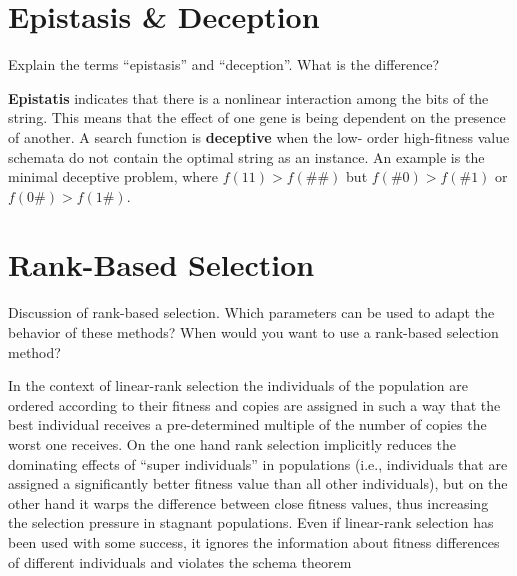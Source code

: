 \documentclass[../main.tex]{subfiles}
\begin{document}
\section{Epistasis & Deception}
\begin{question}
Explain the terms ``epistasis'' and ``deception''. What is the difference?
\end{question}
\begin{solution}
\textbf{Epistatis} indicates that there is a nonlinear interaction among the bits of the string. This means that the
effect of one gene is being dependent on the presence of another. A search function is \textbf{deceptive} when the low-
order high-fitness value schemata do not contain the optimal string as an instance. An example is the minimal deceptive
problem, where $f(11) > f(\#\#)$ but $f(\#0) > f(\#1)$ or $f(0\#) > f(1\#)$.
\end{solution}

\section{Rank-Based Selection}
\begin{question}
Discussion of rank-based selection. Which parameters can be used to adapt the behavior of these methods? When would you
want to use a rank-based selection method?
\end{question}
\begin{solution}
In the context of linear-rank selection the individuals of the population are ordered according to their fitness and
copies are assigned in such a way that the best individual receives a pre-determined multiple of the number of copies
the worst one receives. On the one hand rank selection implicitly reduces the dominating effects of ``super
individuals'' in populations (i.e., individuals that are assigned a significantly better fitness value than all other
individuals), but on the other hand it warps the difference between close fitness values, thus increasing the selection
pressure in stagnant populations. Even if linear-rank selection has been used with some success, it ignores the
information about fitness differences of different individuals and violates the schema theorem
\end{solution}
\end{document}
